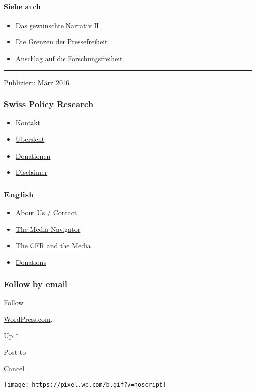 \hypertarget{siehe-auch}{%
\paragraph{Siehe auch}\label{siehe-auch}}

\begin{itemize}
\tightlist
\item
  \href{https://swprs.org/das-gewuenschte-narrativ-ii/}{Das gewünschte
  Narrativ II}
\item
  \href{https://swprs.org/die-grenzen-der-pressefreiheit/}{Die Grenzen
  der Pressefreiheit}
\item
  \href{https://swprs.org/anschlag-auf-die-forschungsfreiheit/}{Anschlag
  auf die Forschungsfreiheit}
\end{itemize}

\begin{center}\rule{0.5\linewidth}{\linethickness}\end{center}

Publiziert: März 2016

\hypertarget{swiss-policy-research}{%
\subsubsection{Swiss Policy Research}\label{swiss-policy-research}}

\begin{itemize}
\tightlist
\item
  \href{https://swprs.org/kontakt/}{Kontakt}
\item
  \href{https://swprs.org/uebersicht/}{Übersicht}
\item
  \href{https://swprs.org/donationen/}{Donationen}
\item
  \href{https://swprs.org/disclaimer/}{Disclaimer}
\end{itemize}

\hypertarget{english}{%
\subsubsection{English}\label{english}}

\begin{itemize}
\tightlist
\item
  \href{https://swprs.org/contact/}{About Us / Contact}
\item
  \href{https://swprs.org/media-navigator/}{The Media Navigator}
\item
  \href{https://swprs.org/the-american-empire-and-its-media/}{The CFR
  and the Media}
\item
  \href{https://swprs.org/donations/}{Donations}
\end{itemize}

\hypertarget{follow-by-email}{%
\subsubsection{Follow by email}\label{follow-by-email}}

Follow

\href{https://wordpress.com/?ref=footer_custom_com}{WordPress.com}.

\protect\hyperlink{}{Up ↑}

Post to

\protect\hyperlink{}{Cancel}

\texttt{[image: https://pixel.wp.com/b.gif?v=noscript]}
